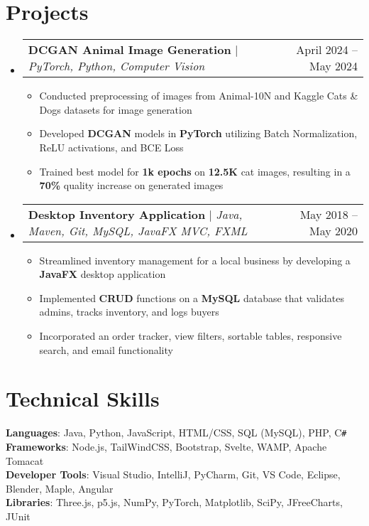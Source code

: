 \documentclass[letterpaper,11pt]{article}
\makeatletter
\newcommand{\resumeItem}[1]{
  \item\small{
    {#1 \vspace{-2pt}}
  }
}
\newcommand{\resumeProjectHeading}[2]{
    \item
    \begin{tabular*}{0.97\textwidth}{l@{\extracolsep{\fill}}r}
      \small#1 & #2 \\
    \end{tabular*}\vspace{-7pt}
}
\newcommand{\resumeSubHeadingListStart}{\begin{itemize}[leftmargin=0.15in, label={}]}
\newcommand{\resumeSubHeadingListEnd}{\end{itemize}}
\newcommand{\resumeItemListStart}{\begin{itemize}}
\newcommand{\resumeItemListEnd}{\end{itemize}\vspace{-5pt}}
\makeatother
\begin{document}
\section{Projects}
    \resumeSubHeadingListStart
      \resumeProjectHeading
          {\textbf{DCGAN Animal Image Generation} $|$ \emph{PyTorch, Python, Computer Vision}}{April 2024 -- May 2024}
          \resumeItemListStart
            
            \resumeItem{Conducted preprocessing of images from Animal-10N and Kaggle Cats \& Dogs datasets for image generation}
            \resumeItem{Developed \textbf{DCGAN} models in \textbf{PyTorch} utilizing Batch Normalization, ReLU activations, and BCE Loss}
            \resumeItem{Trained best model for \textbf{1k epochs} on \textbf{12.5K} cat images, resulting in a \textbf{70\%} quality increase on generated images}
          \resumeItemListEnd
      \resumeProjectHeading
          {\textbf{Desktop Inventory Application} $|$ \emph{Java, Maven, Git, MySQL, JavaFX MVC, FXML}}{May 2018 -- May 2020}
          \resumeItemListStart
            \resumeItem{Streamlined inventory management for a local business by developing a \textbf{JavaFX} desktop application}
            \resumeItem{Implemented \textbf{CRUD} functions on a \textbf{MySQL} database that validates admins, tracks inventory, and logs buyers}
            \resumeItem{Incorporated an order tracker, view filters, sortable tables, responsive search, and email functionality}

          \resumeItemListEnd
    \resumeSubHeadingListEnd



%
\section{Technical Skills}
 \begin{itemize}[leftmargin=0.15in, label={}]
    \small{\item{
     \textbf{Languages}{: Java, Python, JavaScript, HTML/CSS, SQL (MySQL), PHP, C\texttt{\#}} \\
     \textbf{Frameworks}{: Node.js, TailWindCSS, Bootstrap, Svelte, WAMP, Apache Tomacat} \\
     \textbf{Developer Tools}{: Visual Studio, IntelliJ, PyCharm, Git, VS Code, Eclipse, Blender, Maple, Angular} \\
     \textbf{Libraries}{: Three.js, p5.js, NumPy, PyTorch, Matplotlib, SciPy, JFreeCharts, JUnit}
    }}
 \end{itemize}


\end{document}
